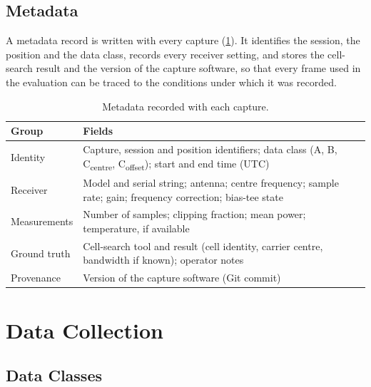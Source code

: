 \subsection{Metadata}
\label{sec:m-metadata}

A metadata record is written with every capture (\cref{tab:m-metadata}). It identifies the session, the position and the data class, records every receiver setting, and stores the cell-search result and the version of the capture software, so that every frame used in the evaluation can be traced to the conditions under which it was recorded.

\begin{table}[tbp]
  \centering
  \small
  \caption[Metadata recorded with each capture]{Metadata recorded with each capture.}
  \label{tab:m-metadata}
  \begin{tabularx}{\textwidth}{@{} >{\raggedright\arraybackslash}p{3.4cm} >{\raggedright\arraybackslash}X @{}}
    \toprule
    Group & Fields \\
    \midrule
    Identity & Capture, session and position identifiers; data class (A, B, C\textsubscript{centre}, C\textsubscript{offset}); start and end time (UTC) \\
    Receiver & Model and serial string; antenna; centre frequency; sample rate; gain; frequency correction; bias-tee state \\
    Measurements & Number of samples; clipping fraction; mean power; temperature, if available \\
    Ground truth & Cell-search tool and result (cell identity, carrier centre, bandwidth if known); operator notes \\
    Provenance & Version of the capture software (Git commit) \\
    \bottomrule
  \end{tabularx}
\end{table}

\section{Data Collection}
\label{sec:m-data}

\subsection{Data Classes}
\label{sec:m-classes}

